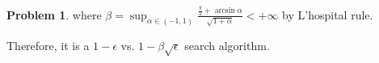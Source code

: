 \documentclass[a4paper]{article}
\theoremstyle{definition}
\newtheorem{problem}{Problem}
\theoremstyle{plain}
\newcommand{\Ebb}{\mathop\mathbb E}
\newcommand{\dps}{\displaystyle}
\newcommand{\<}{\left<}
\renewcommand{\>}{\right>}
\numberwithin{equation}{problem}
\begin{document}
\begin{problem}
  where  $ \beta=\sup_{\alpha\in(-1,1)}\frac{\frac{\pi}{2}+\arcsin \alpha}{\sqrt{1+\alpha}}<+\infty $ by L'hospital rule.

  Therefore, it is a  $ 1-\epsilon $ vs.  $ 1-\beta\sqrt{\epsilon} $ search algorithm.




\end{problem}
\end{document}
